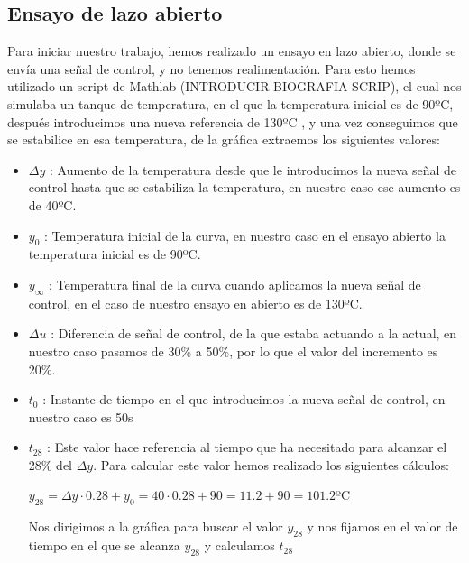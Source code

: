 \documentclass[11pt]{article}
\begin{document}
\subsection{Ensayo de lazo abierto}
Para iniciar nuestro trabajo, hemos realizado un ensayo en lazo abierto, donde se envía una señal de control, y no tenemos realimentación.
Para esto hemos utilizado un script de Mathlab (INTRODUCIR BIOGRAFIA SCRIP), el cual nos simulaba un tanque de temperatura, en el que la temperatura inicial es de 90ºC, después introducimos una nueva referencia de 130ºC , y una vez conseguimos que se estabilice en esa temperatura, de la gráfica extraemos los siguientes valores:
\begin{itemize}
    \item $\Delta y$ : Aumento de la temperatura desde que le introducimos la nueva señal de control hasta que se estabiliza la temperatura, en nuestro caso ese aumento es de 40ºC.

    \item $y_{0}$ : Temperatura inicial de la curva, en nuestro caso en el ensayo abierto la temperatura inicial es de 90ºC.

    \item $y_{\infty}$ : Temperatura final de la curva cuando aplicamos la nueva señal de control, en el caso de nuestro ensayo en abierto es de 130ºC.

    \item $\Delta u$ : Diferencia de señal de control, de la que estaba actuando a la actual, en nuestro caso pasamos de 30\% a 50\%, por lo que el valor del incremento es 20\%.

    \item $t_{0}$ : Instante de tiempo en el que introducimos la nueva señal de control, en nuestro caso es 50s
    
    \item $t_{28}$ : Este valor hace referencia al tiempo que ha necesitado para alcanzar el 28\% del $\Delta y$.
    Para calcular este valor hemos realizado los siguientes cálculos:\\

    \begin{center}
        $y_{28} = \Delta y \cdot  0.28 + y_{0} = 40 \cdot 0.28 + 90 = 11.2 + 90 = 101.2$ºC
    \end{center}
     

    Nos dirigimos a la gráfica para buscar el valor $y_{28}$ y nos fijamos en el valor de tiempo en el que se alcanza $y_{28}$ y calculamos $t_{28}$


\end{itemize}
\end{document}
